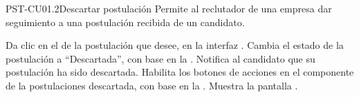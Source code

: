 \clearpage
\begin{UseCase}[]{PST-CU01.2}{Descartar postulación}{
	Permite al reclutador de una empresa dar seguimiento a una postulación recibida de un candidato.
	}
\end{UseCase}

\begin{UCtrayectoria}
	\UCpaso [\UCactor] Da clic en el  de la postulación que desee, en la interfaz .
	\UCpaso [\UCsist] Cambia el estado de la postulación a ``Descartada'', con base en la .
	\UCpaso [\UCsist] Notifica al candidato que su postulación ha sido descartada.
	\UCpaso [\UCsist] Habilita los botones de acciones en el componente  de la postulaciones descartada, con base en la .
	\UCpaso [\UCsist] Muestra la pantalla . 

\end{UCtrayectoria}

